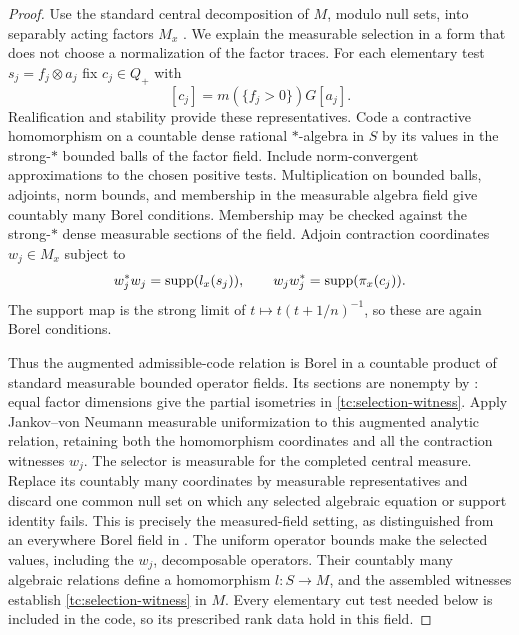 \begin{proof}
Use the standard central decomposition of $M$, modulo null sets, into
separably acting factors $M_x$ \cite[III.5.1.14--15]{Blackadar}.  We explain the measurable selection
in a form that does not choose a normalization of the factor traces.
For each elementary test $s_j=f_j\otimes a_j$ fix $c_j\in Q_+$ with
\begin{equation}\label{tc:transported-representative}
 [c_j]=m(\{f_j>0\})G[a_j].
\end{equation}
Realification and stability provide these representatives.  Code a
contractive homomorphism on a countable dense rational $*$-algebra in
$S$ by its values in the strong-$*$ bounded balls of the factor field.
Include norm-convergent approximations to the chosen positive tests.
Multiplication on bounded balls, adjoints, norm bounds, and membership
in the measurable algebra field give countably many Borel conditions.
Membership may be checked against the strong-$*$ dense measurable
sections of the field.  Adjoin contraction coordinates $w_j\in M_x$
subject to
\begin{equation}\label{tc:selection-witness}
 w_j^*w_j=\operatorname{supp}(l_x(s_j)),\qquad
 w_jw_j^*=\operatorname{supp}(\pi_x(c_j)).
\end{equation}
The support map is the strong limit of
$t\mapsto t(t+1/n)^{-1}$, so these are again Borel conditions.

Thus the augmented admissible-code relation is Borel in a countable
product of standard measurable bounded operator fields. Its sections
are nonempty by : equal factor dimensions
give the partial isometries in \eqref{tc:selection-witness}. Apply
Jankov--von Neumann measurable uniformization to this augmented analytic
relation, retaining both the homomorphism coordinates and
all the contraction witnesses $w_j$. The selector is measurable for
the completed central measure. Replace its countably many coordinates
by measurable representatives and discard one common null set on which
any selected algebraic equation or support identity fails.
This is precisely the measured-field setting, as distinguished from
an everywhere Borel field in \cite[Section~8, especially Lemma~8.6(1),
and the proof of Proposition~3.2]{VaesWouters}.
The uniform operator bounds make the selected values, including the
$w_j$, decomposable operators. Their countably many algebraic relations
define a homomorphism $l:S\to M$, and the assembled witnesses establish
\eqref{tc:selection-witness} in $M$. Every elementary cut test needed
below is included in the code, so its prescribed rank data hold in
this field.
\end{proof}

